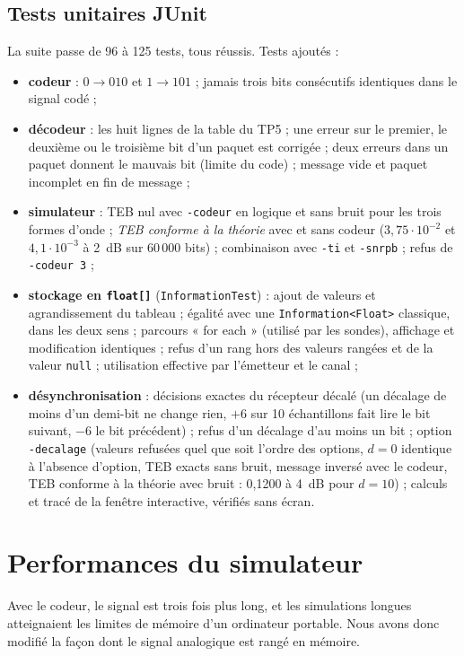 \documentclass[11pt,a4paper]{article}
\newcommand{\cls}[1]{\texttt{#1}}
\begin{document}
\subsection{Tests unitaires JUnit}
La suite passe de 96 à 125 tests, tous réussis. Tests ajoutés :
\begin{itemize}
  \item \textbf{codeur} : $0 \to 010$ et $1 \to 101$ ; jamais trois bits consécutifs identiques dans le signal codé ;
  \item \textbf{décodeur} : les huit lignes de la table du TP5 ; une erreur sur le premier, le deuxième ou le troisième bit d'un paquet est corrigée ; deux erreurs dans un paquet donnent le mauvais bit (limite du code) ; message vide et paquet incomplet en fin de message ;
  \item \textbf{simulateur} : TEB nul avec \texttt{-codeur} en logique et sans bruit pour les trois formes d'onde ; \emph{TEB conforme à la théorie} avec et sans codeur ($3{,}75\cdot10^{-2}$ et $4{,}1\cdot10^{-3}$ à 2~dB sur 60\,000 bits) ; combinaison avec \texttt{-ti} et \texttt{-snrpb} ; refus de \texttt{-codeur 3} ;
  \item \textbf{stockage en \texttt{float[]}} (\texttt{InformationTest}) : ajout de valeurs et agrandissement du tableau ; égalité avec une \cls{Information<Float>} classique, dans les deux sens ; parcours « for each » (utilisé par les sondes), affichage et modification identiques ; refus d'un rang hors des valeurs rangées et de la valeur \texttt{null} ; utilisation effective par l'émetteur et le canal ;
  \item \textbf{désynchronisation} : décisions exactes du récepteur décalé (un décalage de moins d'un demi-bit ne change rien, $+6$ sur 10 échantillons fait lire le bit suivant, $-6$ le bit précédent) ; refus d'un décalage d'au moins un bit ; option \texttt{-decalage} (valeurs refusées quel que soit l'ordre des options, $d = 0$ identique à l'absence d'option, TEB exacts sans bruit, message inversé avec le codeur, TEB conforme à la théorie avec bruit : 0,1200 à 4~dB pour $d = 10$) ; calculs et tracé de la fenêtre interactive, vérifiés sans écran.
\end{itemize}

\section{Performances du simulateur}\label{sec:perf}
Avec le codeur, le signal est trois fois plus long, et les simulations longues atteignaient les limites de mémoire d'un ordinateur portable. Nous avons donc modifié la façon dont le signal analogique est rangé en mémoire.
\end{document}
